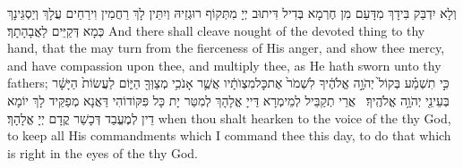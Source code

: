 {וְלָא יִדְבַּק בִּידָךְ מִדָּעַם מִן חֶרְמָא בְּדִיל דִּיתוּב יְיָ מִתְּקוֹף רוּגְזֵיהּ וְיִתֵּין לָךְ רַחֲמִין וִירַחֵים עֲלָךְ וְיַסְגֵּינָךְ כְּמָא דְּקַיֵּים לַאֲבָהָתָךְ׃}
{And there shall cleave nought of the devoted thing to thy hand, that the \lord\space may turn from the fierceness of His anger, and show thee mercy, and have compassion upon thee, and multiply thee, as He hath sworn unto thy fathers;}{}
{כִּ֣י תִשְׁמַ֗ע בְּקוֹל֙ יְהֹוָ֣ה אֱלֹהֶ֔יךָ לִשְׁמֹר֙ אֶת\maqqaf כׇּל\maqqaf מִצְוֺתָ֔יו אֲשֶׁ֛ר אָנֹכִ֥י מְצַוְּךָ֖ הַיּ֑וֹם לַעֲשׂוֹת֙ הַיָּשָׁ֔ר בְּעֵינֵ֖י יְהֹוָ֥ה אֱלֹהֶֽיךָ׃ \setuma }
{אֲרֵי תְקַבֵּיל לְמֵימְרָא דַּייָ אֱלָהָךְ לְמִטַּר יָת כָּל פִּקּוֹדוֹהִי דַּאֲנָא מְפַקֵּיד לָךְ יוֹמָא דֵין לְמֶעֱבַד דְּכָשַׁר קֳדָם יְיָ אֱלָהָךְ׃}
{when thou shalt hearken to the voice of the \lord\space thy God, to keep all His commandments which I command thee this day, to do that which is right in the eyes of the \lord\space thy God.}{}

